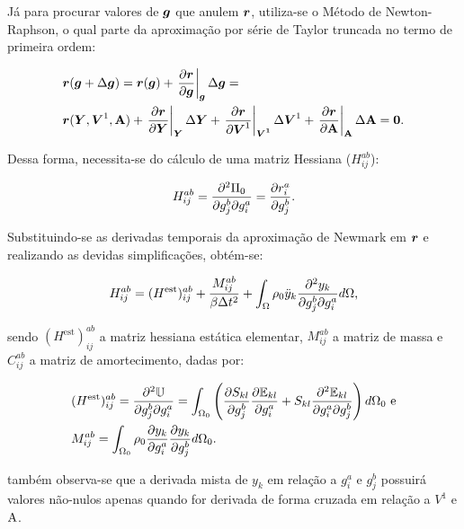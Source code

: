 Já para procurar valores de $\boldsymbol{g}$ que anulem $\boldsymbol{r}$, utiliza-se o Método de Newton-Raphson, o qual parte da aproximação por série de Taylor truncada no termo de primeira ordem:

\begin{equation}
    \begin{split}
        &\boldsymbol{r}(\boldsymbol{g}+\Delta\boldsymbol{g})=\boldsymbol{r}(\boldsymbol{g})+\left.\frac{\partial{\boldsymbol{r}}}{\partial{\boldsymbol{g}}}\right|_{\boldsymbol{\boldsymbol{g}}}\Delta\boldsymbol{g}=\\
        &\boldsymbol{r}(\boldsymbol{Y},\boldsymbol{V}^1,\boldsymbol{\mathrm{A}})+\left.\frac{\partial{\boldsymbol{r}}}{\partial{\boldsymbol{Y}}}\right|_{\boldsymbol{\boldsymbol{Y}}}\Delta\boldsymbol{Y}+\left.\frac{\partial{\boldsymbol{r}}}{\partial{\boldsymbol{V}^1}}\right|_{\boldsymbol{\boldsymbol{V}^1}}\Delta\boldsymbol{V}^1+\left.\frac{\partial{\boldsymbol{r}}}{\partial{\boldsymbol{\mathrm{A}}}}\right|_{\boldsymbol{\boldsymbol{\mathrm{A}}}}\Delta\boldsymbol{\mathrm{A}}=\boldsymbol{0}\text{.}
    \end{split}
\end{equation}

\noindent Dessa forma, necessita-se do cálculo de uma matriz Hessiana ($H_{ij}^{ab}$):

\begin{equation}
    H_{ij}^{ab}=\frac{\partial^2\Pi_0}{\partial g_j^b\partial g_i^a}=\frac{\partial{r_i^a}}{\partial{g_j^b}}\text{.}
\end{equation}

Substituindo-se as derivadas temporais da aproximação de Newmark em $\boldsymbol{r}$ e realizando as devidas simplificações, obtém-se:

\begin{equation}
    H_{ij}^{ab}=(H^\text{est})_{ij}^{ab}+\frac{M_{ij}^{ab}}{\beta\Delta t^2}+\int_{\Omega}{\rho_0\ddot{y}_k\frac{\partial^2{y_k}}{\partial{g_j^b}\partial{g_i^a}} d\Omega}\text{,}
    \label{eq:CSD-Hijab}
\end{equation}

\noindent sendo $(H^\text{est})_{ij}^{ab}$ a matriz hessiana estática elementar, $M_{ij}^{ab}$ a matriz de massa e $C_{ij}^{ab}$ a matriz de amortecimento, dadas por:

\begin{subequations}
    \begin{align}
         & (H^\text{est})_{ij}^{ab}=\frac{\partial^2{\mathbb{U}}}{\partial{g_j^b}\partial{g_i^a}}=\int_{\Omega_0}{\left({\frac{\partial{S_{kl}}}{\partial{g_j^b}}\frac{\partial{\mathbb{E}_{kl}}}{\partial{g_i^a}}+S_{kl}\frac{\partial^2{\mathbb{E}_{kl}}}{\partial{g_i^a}\partial{g_j^b}}}\right) d\Omega_0}\text{ e} \\
         & M_{ij}^{ab}=\int_{\Omega_0}{\rho_0\frac{\partial{y_k}}{\partial{g_i^a}}\frac{\partial{y_k}}{\partial{g_j^b}} d\Omega_0}\text{.}
    \end{align}
    \label{eq:CSD-HMC}
\end{subequations}

\noindent também observa-se que a derivada mista de $y_k$ em relação a $g_i^a$ e $g_j^b$ possuirá valores não-nulos apenas quando for derivada de forma cruzada em relação a $V^1$ e $\mathrm{A}$.

